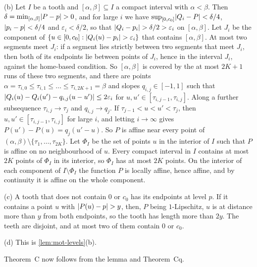 \begin{informalproof}
(b) Let $I$ be a tooth and $[\alpha,\beta]\subseteq I$ a compact interval with $\alpha<\beta$. Then
$\delta=\min_{[\alpha,\beta]}\lvert P-p \rvert>0$, and for large $i$ we have $\sup_{[0,c_0]}\lvert Q_i-P \rvert<\delta/4$,
$\lvert p_i-p \rvert<\delta/4$ and $\varepsilon_i<\delta/2$, so that $\lvert Q_i-p_i \rvert>\delta/2>\varepsilon_i$ on $[\alpha,\beta]$.
Let $J_i$ be the component of $\{u\in[0,c_0]:\lvert Q_i(u)-p_i \rvert>\varepsilon_i\}$ that contains $[\alpha,\beta]$. At most
two segments meet $J_i$: if a segment lies strictly between two segments that meet $J_i$, then both of its endpoints lie
between points of $J_i$, hence in the interval $J_i$, against the home-based condition. So $[\alpha,\beta]$ is covered
by the at most $2K+1$ runs of these two segments, and there are points
$\alpha=\tau_{i,0}\le\tau_{i,1}\le\dots\le\tau_{i,2K+1}=\beta$ and slopes $q_{i,j}\in[-1,1]$ such that
$\lvert Q_i(u)-Q_i(u')-q_{i,j}(u-u') \rvert\le2\varepsilon_i$ for $u,u'\in[\tau_{i,j-1},\tau_{i,j}]$. Along a further
subsequence $\tau_{i,j}\to\tau_j$ and $q_{i,j}\to q_j$. If $\tau_{j-1}<u<u'<\tau_j$, then $u,u'\in[\tau_{i,j-1},\tau_{i,j}]$
for large $i$, and letting $i\to\infty$ gives $P(u')-P(u)=q_j(u'-u)$. So $P$ is affine near every point of
$(\alpha,\beta)\setminus\{\tau_1,\dots,\tau_{2K}\}$. Let $\Phi_I$ be the set of points $u$ in the interior of $I$ such
that $P$ is affine on no neighbourhood of $u$. Every compact interval in $I$ contains at most $2K$ points of $\Phi_I$ in
its interior, so $\Phi_I$ has at most $2K$ points. On the interior of each component of $I\setminus\Phi_I$ the function
$P$ is locally affine, hence affine, and by continuity it is affine on the whole component.

(c) A tooth that does not contain $0$ or $c_0$ has its endpoints at level $p$. If it contains a point $u$ with
$\lvert P(u)-p \rvert>y$, then, $P$ being $1$-Lipschitz, $u$ is at distance more than $y$ from both endpoints, so the tooth has
length more than $2y$. The teeth are disjoint, and at most two of them contain $0$ or $c_0$.

(d) This is \cref{lem:mot-levels}(b).
\end{informalproof}

Theorem~C now follows from the lemma and Theorem~Cq.

